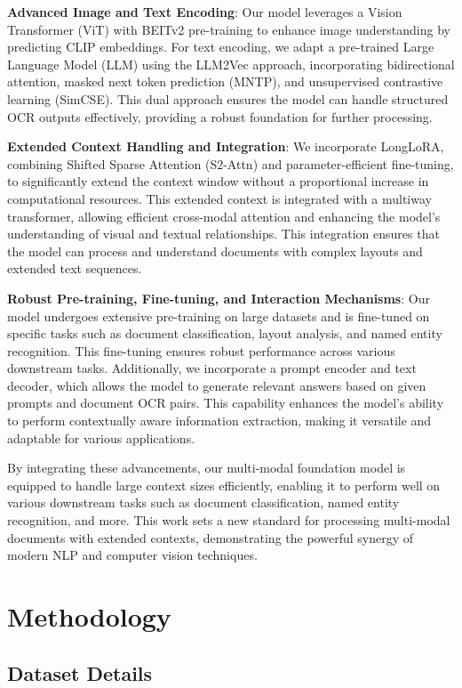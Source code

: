 \documentclass{article}
\begin{document}
\textbf{Advanced Image and Text Encoding}: Our model leverages a Vision Transformer (ViT) with BEITv2 pre-training to enhance image understanding by predicting CLIP embeddings. For text encoding, we adapt a pre-trained Large Language Model (LLM) using the LLM2Vec approach, incorporating bidirectional attention, masked next token prediction (MNTP), and unsupervised contrastive learning (SimCSE). This dual approach ensures the model can handle structured OCR outputs effectively, providing a robust foundation for further processing.

\textbf{Extended Context Handling and Integration}: We incorporate LongLoRA, combining Shifted Sparse Attention (S2-Attn) and parameter-efficient fine-tuning, to significantly extend the context window without a proportional increase in computational resources. This extended context is integrated with a multiway transformer, allowing efficient cross-modal attention and enhancing the model's understanding of visual and textual relationships. This integration ensures that the model can process and understand documents with complex layouts and extended text sequences.

\textbf{Robust Pre-training, Fine-tuning, and Interaction Mechanisms}: Our model undergoes extensive pre-training on large datasets and is fine-tuned on specific tasks such as document classification, layout analysis, and named entity recognition. This fine-tuning ensures robust performance across various downstream tasks. Additionally, we incorporate a prompt encoder and text decoder, which allows the model to generate relevant answers based on given prompts and document OCR pairs. This capability enhances the model's ability to perform contextually aware information extraction, making it versatile and adaptable for various applications.


By integrating these advancements, our multi-modal foundation model is equipped to handle large context sizes efficiently, enabling it to perform well on various downstream tasks such as document classification, named entity recognition, and more. This work sets a new standard for processing multi-modal documents with extended contexts, demonstrating the powerful synergy of modern NLP and computer vision techniques.

\section{Methodology}

\subsection{Dataset Details}
\end{document}
